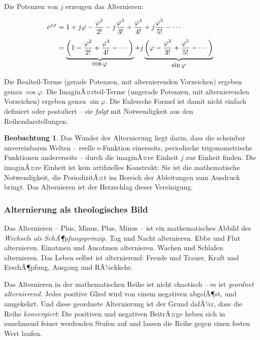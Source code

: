 ﻿\documentclass[a4paper,12pt]{article}
\theoremstyle{definition}
\newtheorem{observation}{Beobachtung}[section]
\begin{document}
Die Potenzen von $j$ erzeugen das Alternieren:

\begin{align}
	e^{j\varphi} &= 1 + j\varphi - \frac{\varphi^2}{2!} - j\frac{\varphi^3}{3!}
	+ \frac{\varphi^4}{4!} + j\frac{\varphi^5}{5!} - \cdots \notag\\[4pt]
	&= \underbrace{\left(1 - \frac{\varphi^2}{2!} + \frac{\varphi^4}{4!}
		- \cdots\right)}_{\displaystyle\cos\varphi}
	+ j\underbrace{\left(\varphi - \frac{\varphi^3}{3!} + \frac{\varphi^5}{5!}
		- \cdots\right)}_{\displaystyle\sin\varphi}
\end{align}

Die Realteil-Terme (gerade Potenzen, mit alternierenden Vorzeichen) ergeben genau
$\cos\varphi$. Die ImaginÃ¤rteil-Terme (ungerade Potenzen, mit alternierenden
Vorzeichen) ergeben genau $\sin\varphi$. Die Eulersche Formel ist damit nicht
einfach definiert oder postuliert -- sie \textit{folgt} mit Notwendigkeit aus
den Reihendarstellungen.

\begin{observation}
	Das Wunder der Alternierung liegt darin, dass die scheinbar unvereinbaren
	Welten -- reelle e-Funktion einerseits, periodische trigonometrische
	Funktionen andererseits -- durch die imaginÃ¤re Einheit $j$ zur Einheit finden.
	Die imaginÃ¤re Einheit ist kein artifzielles Konstrukt: Sie ist die mathematische
	Notwendigkeit, die PeriodizitÃ¤t im Bereich der Ableitungen zum Ausdruck bringt.
	Das Alternieren ist der Herzschlag dieser Vereinigung.
\end{observation}

\subsubsection{Alternierung als theologisches Bild}

Das Alternieren -- Plus, Minus, Plus, Minus -- ist ein mathematisches Abbild
des \textit{Wechsels als SchÃ¶pfungsprinzip}. Tag und Nacht alternieren. Ebbe
und Flut alternieren. Einatmen und Ausatmen alternieren. Wachen und Schlafen
alternieren. Das Leben selbst ist alternierend: Freude und Trauer, Kraft und
ErschÃ¶pfung, Ausgang und RÃ¼ckkehr.

Das Alternieren in der mathematischen Reihe ist nicht chaotisch -- es ist
\textit{geordnet alternierend}. Jedes positive Glied wird von einem negativen
abgelÃ¶st, und umgekehrt. Und diese geordnete Alternierung ist der Grund dafÃ¼r,
dass die Reihe \textit{konvergiert}: Die positiven und negativen BeitrÃ¤ge heben
sich in zunehmend feiner werdenden Stufen auf und lassen die Reihe gegen einen
festen Wert laufen.
\end{document}
